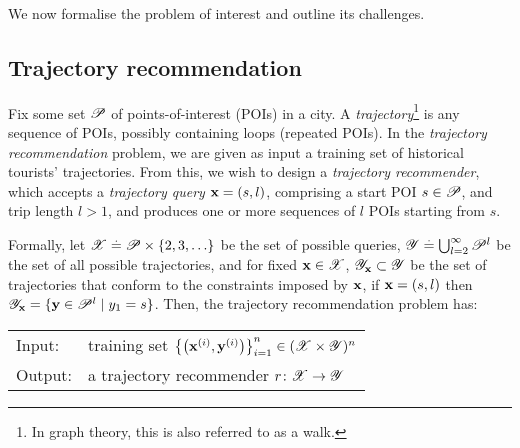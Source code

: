 
We now formalise the problem of interest and outline its challenges.

%
\subsection{Trajectory recommendation}

Fix some set $\mathscr{P}$ of points-of-interest (POIs) in a city.
A \emph{trajectory}\footnote{In graph theory, this is also referred to as a walk.} is any sequence of POIs, possibly containing loops (repeated POIs).
In the \emph{trajectory recommendation} problem, we are given as input a training set of historical tourists' trajectories.
From this, we wish to design a \emph{trajectory recommender}, which accepts a
\emph{trajectory query} $\mathbf{x} = (s, l)$, comprising a start POI $s \in \mathscr{P}$, and trip length $l \!>\! 1$, %
and produces one or more sequences of $l$ POIs starting from $s$. %

Formally, let $\mathscr{X} \stackrel{.}{=} \mathscr{P} \times \{ 2, 3, \ldots \}$ be the set of possible queries,
$\mathscr{Y} \stackrel{.}{=} \bigcup_{l = 2}^\infty \mathscr{P}^l$ be the set of all possible trajectories,
and for fixed $\mathbf{x} \in \mathscr{X}$, $\mathscr{Y}_{\mathbf{x}} \subset \mathscr{Y}$ be the set of trajectories that conform to the constraints imposed by $\mathbf{x}$,
\ie if $\mathbf{x} = (s, l)$ then
$\mathscr{Y}_{\mathbf{x}} = \{ \mathbf{y} \in \mathscr{P}^l \mid y_1 = s \}$.
Then, the {trajectory recommendation} problem has:

\vspace{0.5\baselineskip}

\begin{mdframed}[innertopmargin=3pt,innerbottommargin=3pt,skipbelow=5pt,roundcorner=8pt,backgroundcolor=red!3,topline=false,rightline=false,leftline=false,bottomline=false]
	\begin{tabular}{ll}
		{\sc Input}:  & training set $\left\{ \left( \mathbf{x}^{(i)}, \mathbf{y}^{(i)} \right) \right\}_{i = 1}^n \in ( \mathscr{X} \times \mathscr{Y} )^n$ \\
		{\sc Output}: & a trajectory recommender $r \colon \mathscr{X} \to \mathscr{Y}$ \\
	\end{tabular}
\end{mdframed}

\vspace{0.5\baselineskip}

